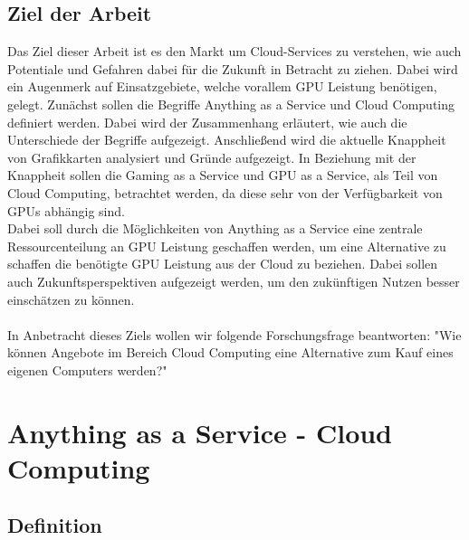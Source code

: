 \documentclass[12pt,toc=bib,toc=listof]{scrreprt}
\begin{document}

\section{Ziel der Arbeit} %
\label{sec:ziel_der_arbeit}

Das Ziel dieser Arbeit ist es den Markt um Cloud-Services zu verstehen, wie auch Potentiale und Gefahren 
dabei für die Zukunft in Betracht zu ziehen. Dabei wird ein Augenmerk auf Einsatzgebiete, welche 
vorallem GPU Leistung benötigen, gelegt.
Zunächst sollen die Begriffe Anything as a Service und Cloud Computing definiert werden. 
Dabei wird der Zusammenhang erläutert, wie auch die Unterschiede der Begriffe aufgezeigt.
Anschließend wird die aktuelle Knappheit von Grafikkarten analysiert und Gründe aufgezeigt.
In Beziehung mit der Knappheit sollen die Gaming as a Service und GPU as a Service, als Teil von Cloud Computing, 
betrachtet werden, da diese sehr von der Verfügbarkeit von GPUs abhängig sind.\\
Dabei soll durch die Möglichkeiten von Anything as a Service eine zentrale Ressourcenteilung an GPU Leistung 
geschaffen werden, um eine Alternative zu schaffen die benötigte GPU Leistung aus der Cloud zu beziehen.
Dabei sollen auch Zukunftsperspektiven aufgezeigt werden, um den zukünftigen Nutzen besser einschätzen zu können.\\
\\In Anbetracht dieses Ziels wollen wir folgende Forschungsfrage beantworten: "Wie können Angebote im Bereich Cloud Computing eine Alternative zum Kauf eines eigenen
Computers werden?"


\chapter{Anything as a Service - Cloud Computing} %
\label{sec:Anything as a Service und Cloud Computing}



\section{Definition} %
\label{sec:Definition}
\end{document}

